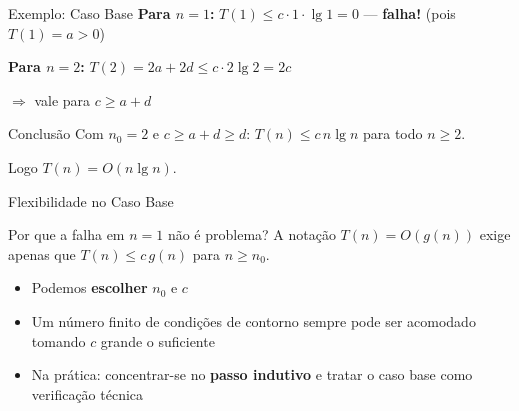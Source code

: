 \documentclass[aspectratio=169]{beamer}
\newcommand{\impt}[1]{\textcolor{maccent}{\textbf{#1}}}
\begin{document}
\begin{frame}{Exemplo: Caso Base}
\textbf{Para $n = 1$:} $T(1) \leq c \cdot 1 \cdot \lg 1 = 0$ --- \impt{falha!} (pois $T(1) = a > 0$)

\vspace{0.3cm}
\pause

\textbf{Para $n = 2$:} $T(2) = 2a + 2d \leq c \cdot 2\lg 2 = 2c$

$\Rightarrow$ vale para $c \geq a + d$

\vspace{0.3cm}
\pause

\begin{alertblock}{Conclusão}
Com $n_0 = 2$ e $c \geq a + d \geq d$: \quad $T(n) \leq c\,n\lg n$ para todo $n \geq 2$.

Logo $T(n) = O(n\lg n)$.
\end{alertblock}
\end{frame}


\begin{frame}{Flexibilidade no Caso Base}
\begin{block}{Por que a falha em $n=1$ não é problema?}
A notação $T(n) = O(g(n))$ exige apenas que $T(n) \leq c\,g(n)$ para $n \geq n_0$.
\end{block}

\vspace{0.3cm}
\pause

\begin{itemize}
    \item Podemos \impt{escolher} $n_0$ e $c$
    \pause
    \item Um número finito de condições de contorno sempre pode ser acomodado tomando $c$ grande o suficiente
    \pause
    \item Na prática: concentrar-se no \impt{passo indutivo} e tratar o caso base como verificação técnica
\end{itemize}
\end{frame}

\end{document}

